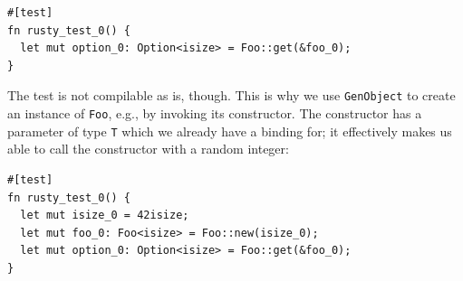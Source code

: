 \documentclass[paper=a4,%
  twoside,%
  BCOR4mm,%
  abstract=true,%
  toc=bibliography,%
  chapterprefix=true,%
  toc=bibliographynumbered,%
  open=right,%
  english,%
  pagesize=pdftex]{scrreprt}
\begin{document}
\begin{lstlisting}[style=boxed, caption={}, label=lst:building-generic-test-1]
#[test]
fn rusty_test_0() {
  let mut option_0: Option<isize> = Foo::get(&foo_0);
}
\end{lstlisting}
The test is not compilable as is, though. This is why we use \texttt{GenObject} to create an instance of \texttt{Foo}, e.g., by invoking its constructor. The constructor has a parameter of type \texttt{T} which we already have a binding for; it effectively makes us able to call the constructor with a random integer: %
\begin{lstlisting}[style=boxed, caption={}, label=lst:building-generic-test-2]
#[test]
fn rusty_test_0() {
  let mut isize_0 = 42isize;
  let mut foo_0: Foo<isize> = Foo::new(isize_0);
  let mut option_0: Option<isize> = Foo::get(&foo_0);
}
\end{lstlisting}





%
%
%
\end{document}
